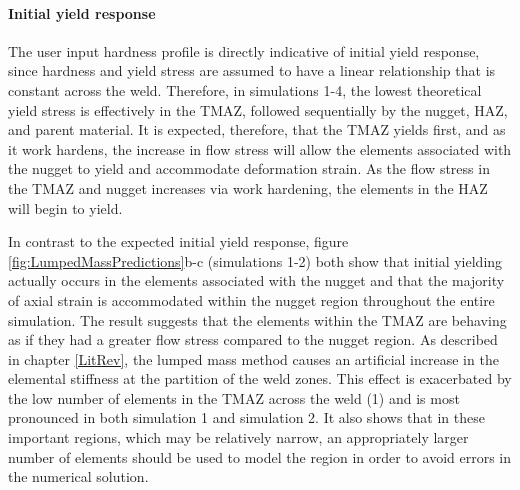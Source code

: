 \paragraph{Initial yield response}
\label{SMDModellingstudyResultsSims1to4Correction1Initialyielding}
The user input hardness profile is directly indicative of initial yield response, since hardness and yield stress are assumed to have a linear relationship that is constant across the weld. Therefore, in simulations 1-4, the lowest theoretical yield stress is effectively in the TMAZ, followed sequentially by the nugget, HAZ, and parent material. It is expected, therefore, that the TMAZ yields first, and as it work hardens, the increase in flow stress will allow the elements associated with the nugget to yield and accommodate deformation strain. As the flow stress in the TMAZ and nugget increases via work hardening, the elements in the HAZ will begin to yield. 

In contrast to the expected initial yield response, figure \ref{fig:LumpedMassPredictions}b-c (simulations 1-2) both show that initial yielding actually occurs in the elements associated with the nugget and that the majority of axial strain is accommodated within the nugget region throughout the entire simulation. 
The result suggests that the elements within the TMAZ are behaving as if they had a greater flow stress compared to the nugget region. As described in chapter \ref{LitRev}, the lumped mass method causes an artificial increase in the elemental stiffness at the partition of the weld zones. This effect is exacerbated by the low number of elements in the TMAZ across the weld (1) and is most pronounced in both simulation 1 and simulation 2. It also shows that in these important regions, which may be relatively narrow, an appropriately larger number of elements should be used to model the region in order to avoid errors in the numerical solution. 

